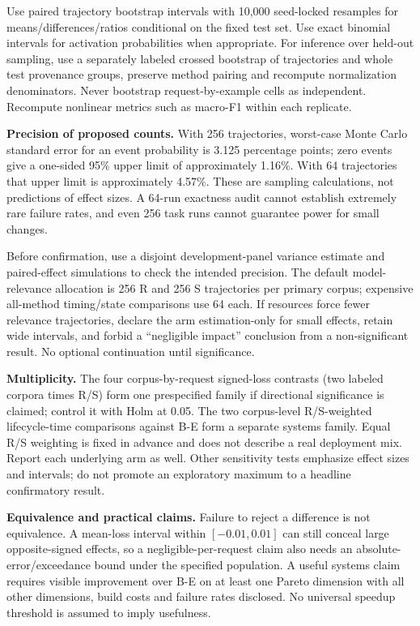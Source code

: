 \documentclass[11pt,a4paper]{article}
\begin{document}
Use paired trajectory bootstrap intervals with 10,000 seed-locked resamples for means/differences/ratios conditional on the fixed test set. Use exact binomial intervals for activation probabilities when appropriate. For inference over held-out sampling, use a separately labeled crossed bootstrap of trajectories and whole test provenance groups, preserve method pairing and recompute normalization denominators. Never bootstrap request-by-example cells as independent. Recompute nonlinear metrics such as macro-F1 within each replicate.

\textbf{Precision of proposed counts.} With 256 trajectories, worst-case Monte Carlo standard error for an event probability is 3.125 percentage points; zero events give a one-sided 95\% upper limit of approximately 1.16\%. With 64 trajectories that upper limit is approximately 4.57\%. These are sampling calculations, not predictions of effect sizes. A 64-run exactness audit cannot establish extremely rare failure rates, and even 256 task runs cannot guarantee power for small changes.

Before confirmation, use a disjoint development-panel variance estimate and paired-effect simulations to check the intended precision. The default model-relevance allocation is 256 R and 256 S trajectories per primary corpus; expensive all-method timing/state comparisons use 64 each. If resources force fewer relevance trajectories, declare the arm estimation-only for small effects, retain wide intervals, and forbid a ``negligible impact'' conclusion from a non-significant result. No optional continuation until significance.

\textbf{Multiplicity.} The four corpus-by-request signed-loss contrasts (two labeled corpora times R/S) form one prespecified family if directional significance is claimed; control it with Holm at 0.05. The two corpus-level R/S-weighted lifecycle-time comparisons against B-E form a separate systems family. Equal R/S weighting is fixed in advance and does not describe a real deployment mix. Report each underlying arm as well. Other sensitivity tests emphasize effect sizes and intervals; do not promote an exploratory maximum to a headline confirmatory result.

\textbf{Equivalence and practical claims.} Failure to reject a difference is not equivalence. A mean-loss interval within $[-0.01,0.01]$ can still conceal large opposite-signed effects, so a negligible-per-request claim also needs an absolute-error/exceedance bound under the specified population. A useful systems claim requires visible improvement over B-E on at least one Pareto dimension with all other dimensions, build costs and failure rates disclosed. No universal speedup threshold is assumed to imply usefulness.
\end{document}
